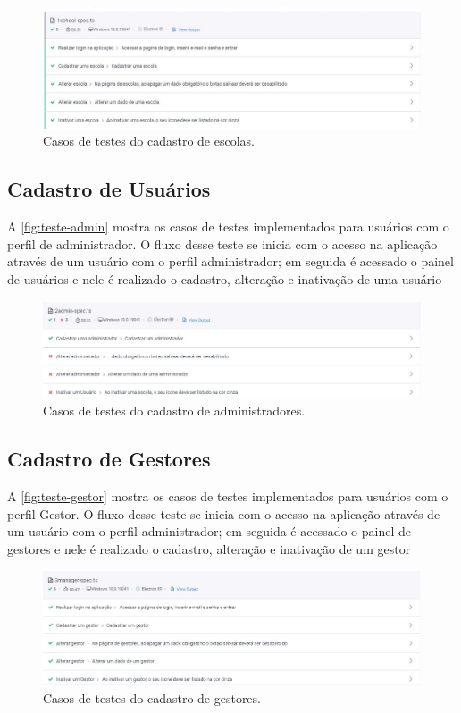 \begin{figure}[htb]
    \centering
	\includegraphics[width=16cm]{imagens/TesteEscola.JPG}
	\caption{\label{fig:teste-escola} Casos de testes do cadastro de escolas.}
\end{figure}

\subsection{Cadastro de Usuários}
A \autoref{fig:teste-admin} mostra os casos de testes implementados para usuários com o perfil de administrador. O fluxo desse teste se inicia com o acesso na aplicação através de um usuário com o perfil administrador; em seguida é acessado o painel de usuários e nele é realizado o cadastro, alteração e inativação de uma usuário

\begin{figure}[htb]
    \centering
	\includegraphics[width=16cm]{imagens/TesteAdmin.JPG}
	\caption{\label{fig:teste-admin} Casos de testes do cadastro de administradores.}
\end{figure}

\subsection{Cadastro de Gestores}
A \autoref{fig:teste-gestor} mostra os casos de testes implementados para usuários com o perfil Gestor. O fluxo desse teste se inicia com o acesso na aplicação através de um usuário com o perfil administrador; em seguida é acessado o painel de gestores e nele é realizado o cadastro, alteração e inativação de um gestor

\begin{figure}[htb]
    \centering
	\includegraphics[width=16cm]{imagens/TestesGestor.JPG}
	\caption{\label{fig:teste-gestor} Casos de testes do cadastro de gestores.}
\end{figure}


